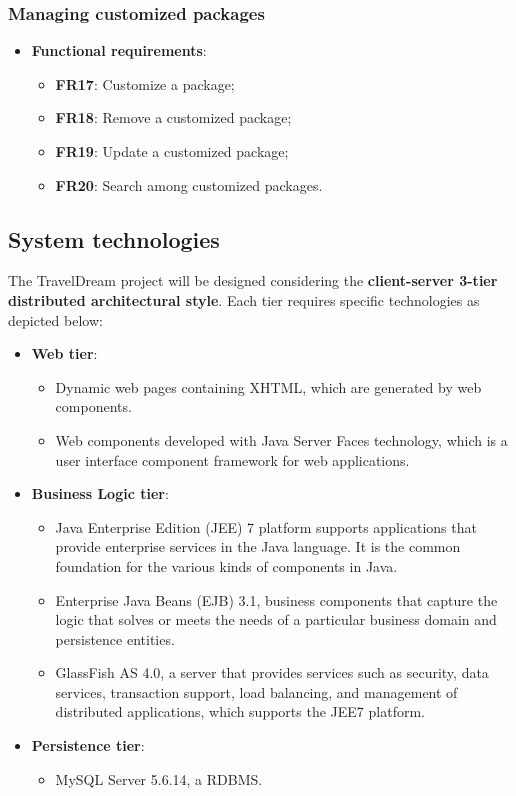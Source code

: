 \documentclass[a4paper,12pt]{book}
\begin{document}
\subsubsection{Managing customized packages}
\begin{itemize}
  \item \textbf{Functional requirements}:
  \begin{itemize}[noitemsep]
    \item \textbf{FR17}: Customize a package;
    \item \textbf{FR18}: Remove a customized package;
    \item \textbf{FR19}: Update a customized package;
    \item \textbf{FR20}: Search among customized packages.
  \end{itemize}
\end{itemize}

\subsection{System technologies}
The TravelDream project will be designed considering the \textbf{client-server 3-tier distributed architectural style}. Each tier requires specific technologies as depicted below:
\begin{itemize}
  \item \textbf{Web tier}:
  \begin{itemize}
    \item Dynamic web pages containing XHTML, which are generated by web components.
    \item Web components developed with Java Server Faces technology, which is a user interface component framework for web applications.
  \end{itemize}
  \item \textbf{Business Logic tier}:
  \begin{itemize}
    \item Java Enterprise Edition (JEE) 7 platform supports applications that provide enterprise services in the Java language. It is the common foundation for the various kinds of components in Java.
    \item Enterprise Java Beans (EJB) 3.1, business components that capture the logic that solves or meets the needs of a particular business domain and persistence entities.
    \item GlassFish AS 4.0, a server that provides services such as security, data services, transaction support, load balancing, and management of distributed applications, which supports the JEE7 platform.
  \end{itemize}
  \item \textbf{Persistence tier}:
  \begin{itemize}
    \item MySQL Server 5.6.14, a RDBMS.
  \end{itemize}
\end{itemize}
\end{document}
